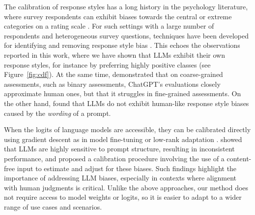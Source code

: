 The calibration of response styles has a long history in the psychology literature, where survey respondents can exhibit biases towards the central or extreme categories on a rating scale \citep{jackson1958content,paulhus1991measurement}. For such settings with a large number of respondents and heterogeneous survey questions, techniques have been developed for identifying and removing response style bias \citep[see, e.g.,][]{van2010identifying,schoonees2015constrained}. This echoes the observations reported in this work, where we have shown that LLMs exhibit their own response styles, for instance by preferring highly positive classes (see Figure~\ref{fig:cdf}). At the same time, \citet{huang-etal-2024-chatgpt} demonstrated that on coarse-grained assessments, such as binary assessments, ChatGPT’s evaluations
closely approximate human ones, but that it struggles in fine-grained assessments. On the other hand, \citet{tjuatja2024llms} found that LLMs do not exhibit human-like response style biases caused by the \emph{wording} of a prompt. 

When the logits of language models are accessible, they can be calibrated directly using gradient descent as in model fine-tuning or low-rank adaptation \cite{reif2024beyond}. \citet{zhao2021calibrate} showed that LLMs are highly sensitive to prompt structure, resulting in inconsistent performance, and proposed a calibration procedure involving the use of a content-free input to estimate and adjust for these biases. Such findings highlight the importance of addressing LLM biases, especially in contexts where alignment with human judgments is critical.
%
Unlike the above approaches, our method does not require access to model weights or logits, so it is easier to adapt to a wider range of use cases and scenarios.


